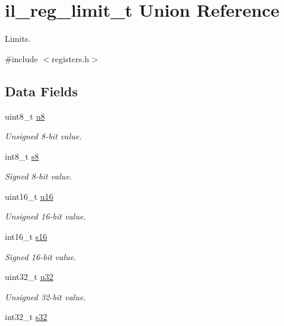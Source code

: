 \hypertarget{unionil__reg__limit__t}{}\section{il\+\_\+reg\+\_\+limit\+\_\+t Union Reference}
\label{unionil__reg__limit__t}


Limits.  




{\ttfamily \#include $<$registers.\+h$>$}

\subsection*{Data Fields}
\begin{DoxyCompactItemize}
\item 
uint8\+\_\+t \hyperlink{unionil__reg__limit__t_aef9083c76539d64e3ca03239a7646f07}{u8}
\begin{DoxyCompactList}\small\item\em Unsigned 8-\/bit value. \end{DoxyCompactList}\item 
int8\+\_\+t \hyperlink{unionil__reg__limit__t_a222839738af51772d82795ec5d625c9c}{s8}
\begin{DoxyCompactList}\small\item\em Signed 8-\/bit value. \end{DoxyCompactList}\item 
uint16\+\_\+t \hyperlink{unionil__reg__limit__t_abdd4796158cab746b84f14e77192f2ec}{u16}
\begin{DoxyCompactList}\small\item\em Unsigned 16-\/bit value. \end{DoxyCompactList}\item 
int16\+\_\+t \hyperlink{unionil__reg__limit__t_a92311f25fb2daa832435239274c5cb2a}{s16}
\begin{DoxyCompactList}\small\item\em Signed 16-\/bit value. \end{DoxyCompactList}\item 
uint32\+\_\+t \hyperlink{unionil__reg__limit__t_a99cf1ff5d5bf0ce76943d15260270211}{u32}
\begin{DoxyCompactList}\small\item\em Unsigned 32-\/bit value. \end{DoxyCompactList}\item 
int32\+\_\+t \hyperlink{unionil__reg__limit__t_a272eb9cd6948fa6137fdef16e4dc9669}{s32}

\end{DoxyCompactItemize}
